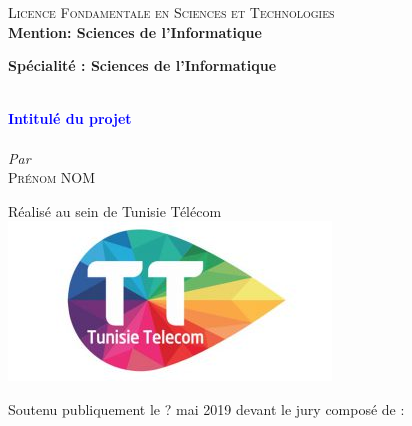 \begin{titlepage}
\textsc{\large Licence Fondamentale en Sciences et Technologies}\\[0.5cm] %

\textbf{Mention: Sciences de l'Informatique}

\textbf{Spécialité : Sciences de l'Informatique}

\vskip1cm%


\HRule \\[0.4cm]
\textcolor{blue}{ \LARGE \bfseries Intitulé du projet}\\[0.4cm] %
\HRule \\[1cm]

\vskip0.5cm%
\textit{Par}\\
\textsc{\large Prénom NOM}\\[0.5cm] %
\vskip0.5cm%

{Réalisé au sein de Tunisie Télécom}\\
\includegraphics[width=0.2\columnwidth]{tt-logo.jpg}\\

\vskip1cm
 
 \begin{flushleft}
Soutenu publiquement le ? mai 2019 devant le jury composé de :
\smallskip


\end{flushleft}
\end{titlepage}
